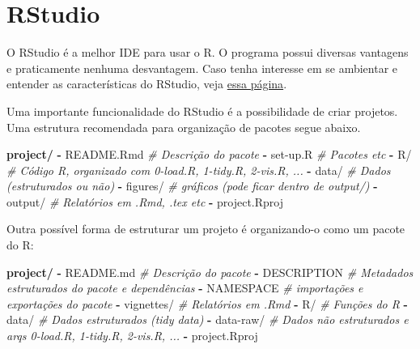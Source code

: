 \documentclass[]{book}
\newenvironment{Shaded}{\begin{snugshade}}{\end{snugshade}}
\newcommand{\KeywordTok}[1]{\textcolor[rgb]{0.13,0.29,0.53}{\textbf{{#1}}}}
\newcommand{\CommentTok}[1]{\textcolor[rgb]{0.56,0.35,0.01}{\textit{{#1}}}}
\newcommand{\NormalTok}[1]{{#1}}
\begin{document}
\section{RStudio}\label{rstudio}

O RStudio é a melhor IDE para usar o R. O programa possui diversas
vantagens e praticamente nenhuma desvantagem. Caso tenha interesse em se
ambientar e entender as características do RStudio, veja
\href{https://csgillespie.github.io/efficientR/set-up.html\#rstudio}{essa
página}.

Uma importante funcionalidade do RStudio é a possibilidade de criar
projetos. Uma estrutura recomendada para organização de pacotes segue
abaixo.

\begin{Shaded}
\begin{Highlighting}[]
\KeywordTok{project/}
  \KeywordTok{-} \NormalTok{README.Rmd   }\CommentTok{# Descrição do pacote}
  \KeywordTok{-} \NormalTok{set-up.R     }\CommentTok{# Pacotes etc}
  \KeywordTok{-} \NormalTok{R/           }\CommentTok{# Código R, organizado com 0-load.R, 1-tidy.R, 2-vis.R, ...}
  \KeywordTok{-} \NormalTok{data/        }\CommentTok{# Dados (estruturados ou não)}
  \KeywordTok{-} \NormalTok{figures/     }\CommentTok{# gráficos (pode ficar dentro de output/)}
  \KeywordTok{-} \NormalTok{output/      }\CommentTok{# Relatórios em .Rmd, .tex etc}
  \KeywordTok{-} \NormalTok{project.Rproj}
\end{Highlighting}
\end{Shaded}

Outra possível forma de estruturar um projeto é organizando-o como um
pacote do R:

\begin{Shaded}
\begin{Highlighting}[]
\KeywordTok{project/}
  \KeywordTok{-} \NormalTok{README.md    }\CommentTok{# Descrição do pacote}
  \KeywordTok{-} \NormalTok{DESCRIPTION  }\CommentTok{# Metadados estruturados do pacote e dependências}
  \KeywordTok{-} \NormalTok{NAMESPACE    }\CommentTok{# importações e exportações do pacote}
  \KeywordTok{-} \NormalTok{vignettes/   }\CommentTok{# Relatórios em .Rmd}
  \KeywordTok{-} \NormalTok{R/           }\CommentTok{# Funções do R}
  \KeywordTok{-} \NormalTok{data/        }\CommentTok{# Dados estruturados (tidy data)}
  \KeywordTok{-} \NormalTok{data-raw/    }\CommentTok{# Dados não estruturados e arqs 0-load.R, 1-tidy.R, 2-vis.R, ...}
  \KeywordTok{-} \NormalTok{project.Rproj}
\end{Highlighting}
\end{Shaded}
\end{document}
